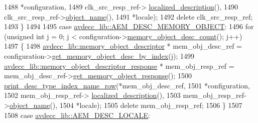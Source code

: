 \begin{DoxyCode}
1488                                                *configuration,
1489                                                clk\_src\_resp\_ref->
      \hyperlink{classavdecc__lib_1_1clock__source__descriptor__response_a1fb9de45567df344090a1407aa6b775f}{localized\_description}(),
1490                                                clk\_src\_resp\_ref->\hyperlink{classavdecc__lib_1_1descriptor__response__base_a133f7774946d80f82b8aaaa4cfbb7361}{object\_name}(),
1491                                                *locale);
1492                 \textcolor{keyword}{delete} clk\_src\_resp\_ref;
1493             \}
1494 
1495         \textcolor{keywordflow}{case} \hyperlink{namespaceavdecc__lib_ac7b7d227e46bc72b63ee9e9aae15902fa431f37de8bfa92a0b5353d7b741df6a2}{avdecc\_lib::AEM\_DESC\_MEMORY\_OBJECT}:
1496             \textcolor{keywordflow}{for} (\textcolor{keywordtype}{unsigned} \textcolor{keywordtype}{int} j = 0; j < configuration->\hyperlink{classavdecc__lib_1_1configuration__descriptor_a4fcdc5299d3ef799c90daf54040ead95}{memory\_object\_desc\_count}();
       j++)
1497             \{
1498                 \hyperlink{classavdecc__lib_1_1memory__object__descriptor}{avdecc\_lib::memory\_object\_descriptor} * mem\_obj\_desc\_ref
       = configuration->\hyperlink{classavdecc__lib_1_1configuration__descriptor_aec4a4aacf26169bc5dd38bc719f4ae82}{get\_memory\_object\_desc\_by\_index}(j);
1499                 \hyperlink{classavdecc__lib_1_1memory__object__descriptor__response}{avdecc\_lib::memory\_object\_descriptor\_response} 
      * mem\_obj\_resp\_ref = mem\_obj\_desc\_ref->\hyperlink{classavdecc__lib_1_1memory__object__descriptor_ae85115ea5521b42712e2807173f9b45e}{get\_memory\_object\_response}();
1500                 \hyperlink{classcmd__line_ac47c21c03b69593b74e7c43201d0ba41}{print\_desc\_type\_index\_name\_row}(*mem\_obj\_desc\_ref,
1501                                                *configuration,
1502                                                mem\_obj\_resp\_ref->
      \hyperlink{classavdecc__lib_1_1memory__object__descriptor__response_a1fb9de45567df344090a1407aa6b775f}{localized\_description}(),
1503                                                mem\_obj\_resp\_ref->\hyperlink{classavdecc__lib_1_1descriptor__response__base_a133f7774946d80f82b8aaaa4cfbb7361}{object\_name}(),
1504                                                *locale);
1505                 \textcolor{keyword}{delete} mem\_obj\_resp\_ref;
1506             \}
1507 
1508         \textcolor{keywordflow}{case} \hyperlink{namespaceavdecc__lib_ac7b7d227e46bc72b63ee9e9aae15902fafe9b509497773b71583f43c1de58e3e5}{avdecc\_lib::AEM\_DESC\_LOCALE}:

\end{DoxyCode}
